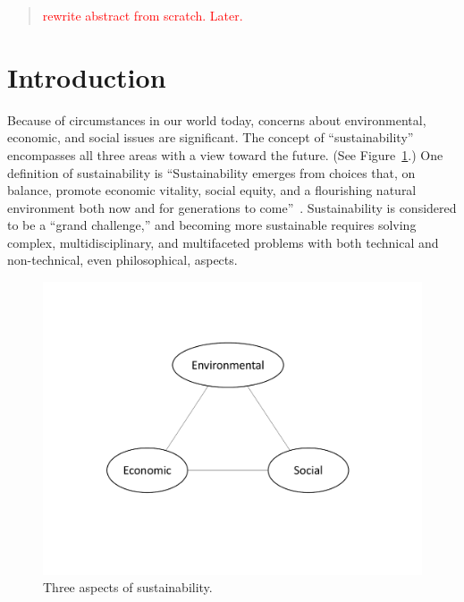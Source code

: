 \documentclass[12pt]{article}
\date{}                           %
\newcommand{\ins}[1]{\textcolor{red}{#1}}
\begin{document}
	
\maketitle

\begin{abstract}
\noindent
\ins{rewrite abstract from scratch. Later.}

\end{abstract}


\section{Introduction}
\label{sec:introduction}

Because of circumstances in our world today, 
concerns about environmental, economic, and social 
issues are significant. 
The concept of ``sustainability'' encompasses all three areas
with a view toward the future. 
(See Figure~\ref{fig:3_sustain}.)
One definition of sustainability is
``Sustainability emerges from choices that, on balance, 
promote economic vitality, social equity, and a flourishing natural environment 
both now and for generations to come''~\autocite{Calvin-College-2017}.
Sustainability is considered to be a ``grand challenge,'' 
and becoming more sustainable requires solving 
complex, multidisciplinary, and multifaceted problems
with both technical and non-technical, even philosophical, aspects. 

\begin{figure}
\centering
\includegraphics[width=0.75\linewidth]{figure_other/TriangleDiagram.pdf}
\caption{Three aspects of sustainability.}
\label{fig:3_sustain}
\end{figure}
\end{document}
